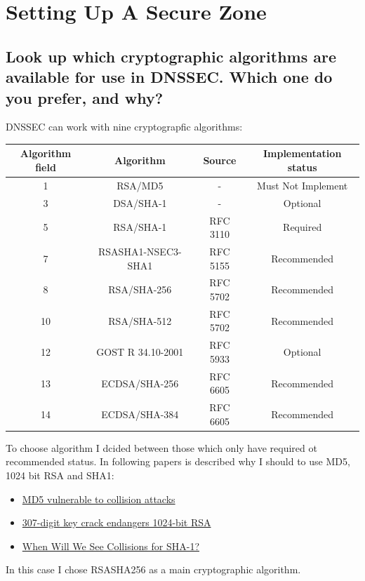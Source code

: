 \documentclass[a4paper,11pt]{article}
\begin{document}
\section{Setting Up A Secure Zone}
\addtocounter{subsection}{8}
\subsection{Look up which cryptographic algorithms are available for use in DNSSEC. Which one do you prefer, and why?}
DNSSEC can work with nine cryptograpfic algorithms:

\begin{center}
\begin{tabular}{|c|c|c|c|}
\hline
Algorithm field & Algorithm & Source & Implementation status \\ \hline\hline
1 & RSA/MD5 & - & Must Not Implement \\ \hline
3 & DSA/SHA-1 & - & Optional \\ \hline
5 & RSA/SHA-1 & RFC 3110 & Required \\ \hline
7 & RSASHA1-NSEC3-SHA1 & RFC 5155 &	Recommended \\ \hline
8 & RSA/SHA-256 & RFC 5702 & Recommended \\ \hline
10 & RSA/SHA-512 & RFC 5702 & Recommended \\ \hline
12 & GOST R 34.10-2001 & RFC 5933 & Optional \\ \hline
13 & ECDSA/SHA-256 & RFC 6605 & Recommended \\ \hline
14 & ECDSA/SHA-384 & RFC 6605 & Recommended \\ \hline
\end{tabular}
\end{center}
To choose algorithm I dcided between those which only have required ot recommended status. In following papers is described why I should to use MD5, 1024 bit RSA and SHA1:
\begin{itemize}
	\item \href{http://www.kb.cert.org/vuls/id/836068}{MD5 vulnerable to collision attacks}
	\item \href{http://arstechnica.com/uncategorized/2007/05/researchers-307-digit-key-crack-endangers-1024-bit-rsa/}{307-digit key crack endangers 1024-bit RSA}
	\item \href{https://www.schneier.com/blog/archives/2012/10/when_will_we_se.html}{When Will We See Collisions for SHA-1?}
\end{itemize}
In this case I chose RSASHA256 as a main cryptographic algorithm.
\end{document}
